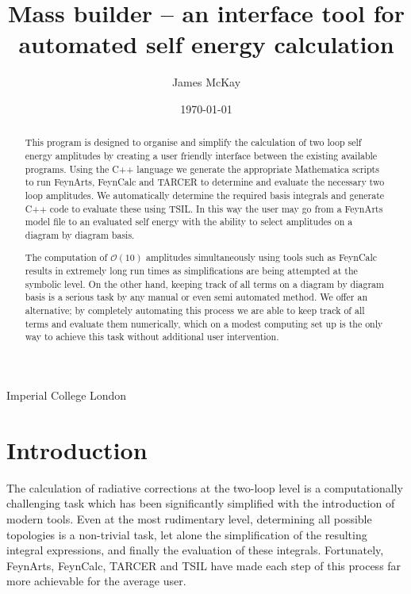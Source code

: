 



\def\A{\mathcal{A}}
\def\B{\mathcal{B}}
\def\C{\mathcal{C}}



\title{Mass builder -- an interface tool for automated self energy calculation}
%
\author
{
  James McKay
}
%
%
\institute
{
  Imperial College London\label{addr1}
}
%
\date{\today}

\maketitle

\begin{abstract}

This program is designed to organise and simplify the calculation of two loop self energy amplitudes by creating a user friendly interface between the existing available programs.  Using the C++ language we generate the appropriate Mathematica scripts to run FeynArts, FeynCalc and TARCER to determine and evaluate the necessary two loop amplitudes.  We automatically determine the required basis integrals and generate C++ code to evaluate these using TSIL.  In this way the user may go from a FeynArts model file to an evaluated self energy with the ability to select amplitudes on a diagram by diagram basis.

The computation of $\mathcal{O}(10)$ amplitudes simultaneously using tools such as FeynCalc results in extremely long run times as simplifications are being attempted at the symbolic level.  On the other hand, keeping track of all terms on a diagram by diagram basis is a serious task by any manual or even semi automated method.  We offer an alternative; by completely automating this process we are able to keep track of all terms and evaluate them numerically, which on a modest computing set up is the only way to achieve this task without additional user intervention.

\end{abstract}

\tableofcontents

\section{Introduction}

The calculation of radiative corrections at the two-loop level is a computationally challenging task which has been significantly simplified with the introduction of modern tools.  Even at the most rudimentary level, determining all possible topologies is a non-trivial task, let alone the simplification of the resulting integral expressions, and finally the evaluation of these integrals.  Fortunately, FeynArts, FeynCalc, TARCER and TSIL have made each step of this process far more achievable for the average user.


